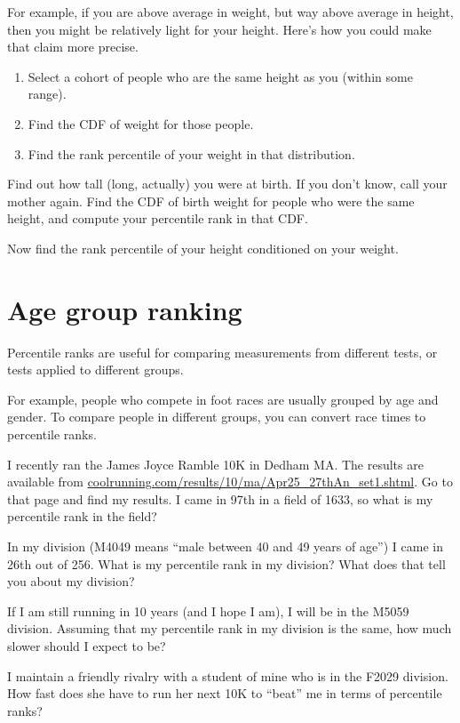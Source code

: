 \documentclass[12pt]{book}
\begin{document}
For example, if you are above average in weight, but way above average
in height, then you might be relatively light for your height.  Here's
how you could make that claim more precise.

\begin{enumerate}

\item Select a cohort of people who are the same height as you (within
some range).

\item Find the CDF of weight for those people.

\item Find the rank percentile of your weight in that distribution.

\end{enumerate}


\begin{ex}
Find out how tall (long, actually) you were at birth.  If you don't
know, call your mother again.  Find the CDF of birth weight for
people who were the same height, and compute your percentile rank
in that CDF.

Now find the rank percentile of your height conditioned on your weight.
\end{ex}


\section{Age group ranking}

Percentile ranks are useful for comparing measurements from different
tests, or tests applied to different groups.

For example, people who compete in foot races are usually grouped by
age and gender.  To compare people in different groups, you can convert
race times to percentile ranks.

\begin{ex}

I recently ran the James Joyce Ramble 10K
in Dedham MA.  The results are available from
\url{coolrunning.com/results/10/ma/Apr25_27thAn_set1.shtml}.
Go to that page and find my results.  I came in 97th in a field
of 1633, so what is my percentile rank in the field?

In my division (M4049 means ``male between 40 and 49 years of age'')
I came in 26th out of 256.  What is my percentile rank in my division?
What does that tell you about my division?

If I am still running in 10 years (and I hope I am), I will be in
the M5059 division.  Assuming that my percentile rank in my division
is the same, how much slower should I expect to be?

I maintain a friendly rivalry with a student of mine who is in the
F2029 division.  How fast does she have to run her next 10K to
``beat'' me in terms of percentile ranks?

\end{ex}
\end{document}
